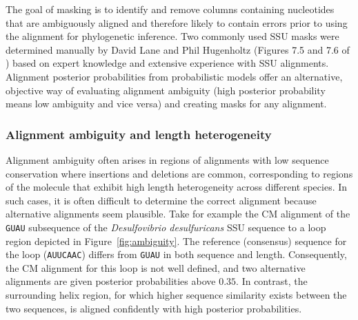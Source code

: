 The goal of masking is to identify and remove columns containing
nucleotides that are ambiguously aligned and therefore likely to contain
errors prior to using the alignment for phylogenetic inference.  Two
commonly used SSU masks were determined manually by David Lane and
Phil Hugenholtz (Figures 7.5 and 7.6 of \cite{Nawrocki09b}) based on
expert knowledge and extensive experience with SSU alignments.
Alignment posterior probabilities from
probabilistic models offer an alternative, objective way of evaluating
alignment ambiguity (high posterior probability means low ambiguity
and vice versa) and creating masks for any alignment.

\subsubsection{Alignment ambiguity and length heterogeneity}

Alignment ambiguity often arises in regions of alignments with low
sequence conservation where insertions and deletions are common,
corresponding to regions of the molecule that exhibit high length
heterogeneity across different species. In such cases, it is often
difficult to determine the correct alignment because alternative
alignments seem plausible. Take for example the CM alignment
of the {\tt GUAU} subsequence of the \emph{Desulfovibrio
desulfuricans} SSU sequence to a loop region depicted in
Figure~\ref{fig:ambiguity}. The reference (consensus) sequence for the
loop ({\tt AUUCAAC}) differs from {\tt GUAU} in both sequence and
length. Consequently, the CM alignment for this loop is not well
defined, and two alternative alignments are given posterior
probabilities above $0.35$.  In contrast, the surrounding helix
region, for which higher sequence similarity exists between the two
sequences, is aligned confidently with high posterior probabilities.

